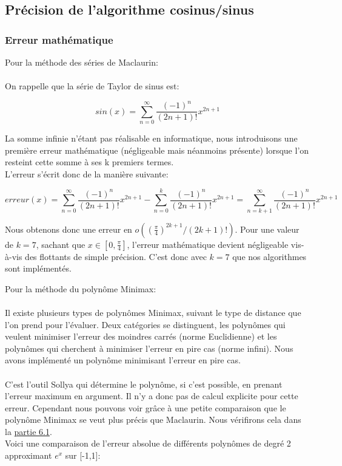 \documentclass[12pt]{article}
\begin{document}
\subsection{Précision de l'algorithme cosinus/sinus}
\subsubsection{Erreur mathématique}
\label{sec:erreurmath}

Pour la méthode des séries de Maclaurin:\\
\\
On rappelle que la série de Taylor de sinus est:
\begin{center}
 $$  sin(x) = \sum_{n=0}^{\infty} \frac{(-1)^n}{(2n+1)!}x^{2n+1}$$
\end{center}

La somme infinie n'étant pas réalisable en informatique, nous introduisons une première erreur mathématique
(négligeable mais néanmoins présente) lorsque l'on resteint cette somme à ses k premiers termes.\\
L'erreur s'écrit donc de la manière suivante:

\begin{center}
  $$erreur(x) = \sum_{n=0}^{\infty} \frac{(-1)^n}{(2n+1)!}x^{2n+1} - \sum_{n=0}^{k} \frac{(-1)^n}{(2n+1)!}x^{2n+1} = \sum_{n=k+1}^{\infty} \frac{(-1)^n}{(2n+1)!}x^{2n+1}$$
\end{center}

Nous obtenons donc une erreur en $o((\frac{\pi}{4})^{2k+1}/(2k+1)!)$.
Pour une valeur de $k=7$, sachant que $x \in [0, \frac{\pi}{4}]$, l'erreur mathématique devient négligeable
vis-à-vis des flottants de simple précision. C'est donc avec $k=7$ que nos algorithmes sont implémentés.

Pour la méthode du polynôme Minimax:\\
\\
Il existe plusieurs types de polynômes Minimax, suivant le type de distance que l'on prend
pour l'évaluer. Deux catégories se distinguent, les polynômes qui veulent minimiser l'erreur
des moindres carrés (norme Euclidienne) et les polynômes qui cherchent à minimiser l'erreur en pire
 cas (norme infini). Nous avons implémenté un polynôme minimisant l'erreur en pire cas.\\
\\
C'est l'outil Sollya qui détermine le polynôme, si c'est possible, en prenant l'erreur maximum en argument.
Il n'y a donc pas de calcul explicite pour cette erreur. Cependant nous pouvons voir grâce à
une petite comparaison que le polynôme Minimax se veut plus précis que Maclaurin. Nous vérifirons cela
dans la \hyperref[sec:tests1]{partie 6.1}.\\
Voici une comparaison de l'erreur absolue de différents polynômes de degré 2 approximant $e^x$ sur [-1,1]:
\end{document}
